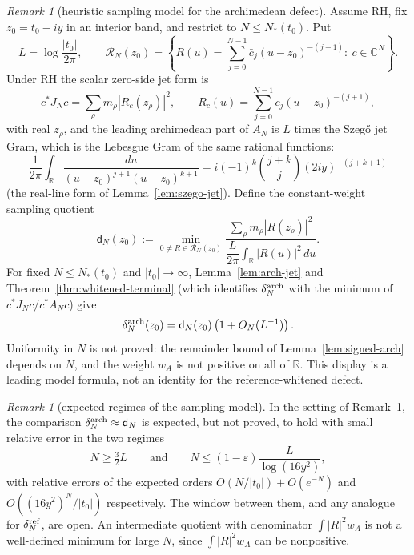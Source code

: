 \documentclass[11pt]{amsart}
\theoremstyle{definition}
\theoremstyle{remark}
\newtheorem{remark}[theorem]{Remark}
\theoremstyle{definition}
\newcommand{\R}{\mathbb{R}}
\newcommand{\C}{\mathbb{C}}
\begin{document}
\begin{remark}[heuristic sampling model for the archimedean defect]\label{thm:defect-sampling}
Assume RH, fix $z_0=t_0-iy$ in an interior band, and restrict to $N\le N_*(t_0)$.  Put
\[
   L=\log\frac{|t_0|}{2\pi},
   \qquad
   \mathcal R_N(z_0)=
   \left\{
      R(u)=\sum_{j=0}^{N-1}\bar c_j(u-z_0)^{-(j+1)}:\ c\in\C^N
   \right\}.
\]
Under RH the scalar zero-side jet form is
\[
   c^*J_Nc=\sum_\rho m_\rho |R_c(z_\rho)|^2,
   \qquad
   R_c(u)=\sum_{j=0}^{N-1}\bar c_j(u-z_0)^{-(j+1)},
\]
with real $z_\rho$, and the leading archimedean part of $A_N$ is $L$ times the Szeg\H{o} jet Gram,
which is the Lebesgue Gram of the same rational functions:
\[
   \frac1{2\pi}\int_\R
   \frac{du}{(u-z_0)^{j+1}(u-\bar z_0)^{k+1}}
   =
   i(-1)^k\binom{j+k}{j}(2iy)^{-(j+k+1)}
\]
(the real-line form of Lemma~\ref{lem:szego-jet}).  Define the constant-weight sampling quotient
\[
   \mathsf d_N(z_0)
   :=
   \min_{0\ne R\in\mathcal R_N(z_0)}
   \frac{\sum_\rho m_\rho |R(z_\rho)|^2}
        {\dfrac{L}{2\pi}\displaystyle\int_\R |R(u)|^2\,du}.
\]
For fixed $N\le N_*(t_0)$ and $|t_0|\to\infty$, Lemma~\ref{lem:arch-jet} and
Theorem~\ref{thm:whitened-terminal} (which identifies $\delta_N^{\rm arch}$ with the minimum of
$c^*J_Nc/c^*A_Nc$) give
\[
   \delta_N^{\rm arch}(z_0)=\mathsf d_N(z_0)\left(1+O_N(L^{-1})\right).
\]
Uniformity in $N$ is not proved: the remainder bound of Lemma~\ref{lem:signed-arch} depends on $N$,
and the weight $w_A$ is not positive on all of $\R$.  This display is a leading model formula, not an
identity for the reference-whitened defect.
\end{remark}

\begin{remark}[expected regimes of the sampling model]\label{thm:defect-sampling-v2}
In the setting of Remark~\ref{thm:defect-sampling}, the comparison
$\delta_N^{\rm arch}\approx\mathsf d_N$ is expected, but not proved, to hold with small relative error
in the two regimes
\[
   N\ge\tfrac32L
   \qquad\text{and}\qquad
   N\le(1-\varepsilon)\frac{L}{\log(16y^2)},
\]
with relative errors of the expected orders $O(N/|t_0|)+O(e^{-N})$ and $O((16y^2)^N/|t_0|)$
respectively.  The window between them, and any analogue for $\delta_N^{\rm ref}$, are open.  An
intermediate quotient with denominator $\int|R|^2w_A$ is not a well-defined minimum for large $N$,
since $\int|R|^2w_A$ can be nonpositive.
\end{remark}
\end{document}
